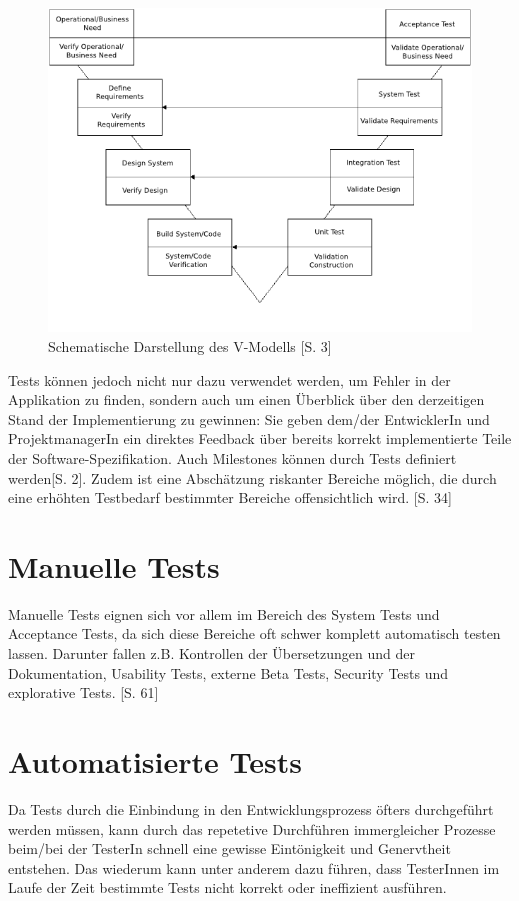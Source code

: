 \documentclass[a4paper,bibtotoc,oneside]{scrbook}
\begin{document}
\begin{figure}[h!]
\centering
\includegraphics[width=120mm]{img/vmodel.png}
\caption[Schematische Darstellung des V-Modells]{Schematische Darstellung des V-Modells \cite{vmodel}[S. 3]}\label{Abb3}
\end{figure}

Tests können jedoch nicht nur dazu verwendet werden, um Fehler in der Applikation zu finden, sondern auch um einen Überblick über den derzeitigen Stand der Implementierung zu gewinnen: Sie geben dem/der EntwicklerIn und ProjektmanagerIn ein direktes Feedback über bereits korrekt implementierte Teile der Software-Spezifikation. Auch Milestones können durch Tests definiert werden\cite{test_auto}[S. 2]. Zudem ist eine Abschätzung riskanter Bereiche möglich, die durch eine erhöhten Testbedarf bestimmter Bereiche offensichtlich wird. \cite{testing_apps_on_web}[S. 34]


\section{Manuelle Tests}
Manuelle Tests eignen sich vor allem im Bereich des System Tests und Acceptance Tests, da sich diese Bereiche oft schwer komplett automatisch testen lassen. Darunter fallen z.B. Kontrollen der Übersetzungen und der Dokumentation, Usability Tests, externe Beta Tests, Security Tests und explorative Tests. \cite{test_large_systems}[S. 61]


\section{Automatisierte Tests}
Da Tests durch die Einbindung in den Entwicklungsprozess öfters durchgeführt werden müssen, kann durch das repetetive Durchführen immergleicher Prozesse beim/bei der TesterIn schnell eine gewisse Eintönigkeit und Genervtheit entstehen. Das wiederum kann unter anderem dazu führen, dass TesterInnen im Laufe der Zeit bestimmte Tests nicht korrekt oder ineffizient ausführen.
\end{document}
